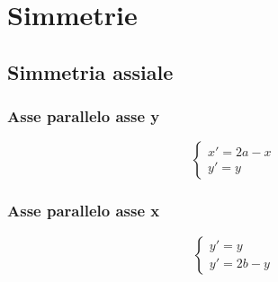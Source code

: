 \chapter{Simmetrie}
\section{Simmetria assiale}
\subsection{Asse parallelo asse y}
\begin{tcolorbox}[sidebyside,righthand width=7cm,colback=white,colframe=white,fonttitle=\bfseries	]

\tcblower
	\[\begin{cases}
	x'=2a-x\\
	y'=y
	\end{cases}
	\]
\end{tcolorbox}
\subsection{Asse parallelo asse x}
\begin{tcolorbox}[sidebyside,righthand width=7cm,colback=white,colframe=white,fonttitle=\bfseries	]
	
	\tcblower
	\[\begin{cases}
	y'=y\\
	y'=2b-y
	\end{cases}
	\]
\end{tcolorbox}